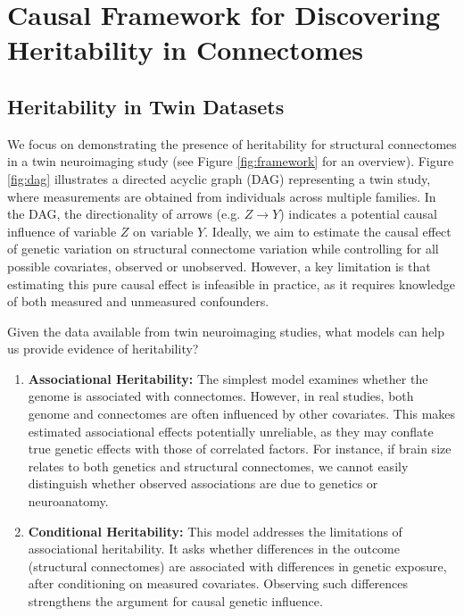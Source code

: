 \section{Causal Framework for Discovering Heritability in Connectomes} 
\subsection{Heritability in Twin Datasets}
We focus on demonstrating the presence of heritability for structural connectomes in a twin neuroimaging study (see Figure \ref{fig:framework} for an overview). Figure \ref{fig:dag} illustrates a directed acyclic graph (DAG) representing a twin study, where measurements are obtained from individuals across multiple families. In the DAG, the directionality of arrows (e.g. $Z\rightarrow Y$)  indicates a potential causal influence of variable $Z$ on variable $Y$. Ideally, we aim to estimate the causal effect of genetic variation on structural connectome variation while controlling for all possible covariates, observed or unobserved. However, a key limitation is that estimating this pure causal effect is infeasible in practice, as it requires knowledge of both measured and unmeasured confounders.

Given the data available from twin neuroimaging studies, what models can help us provide evidence of heritability?
\begin{enumerate}
    \item \textbf{Associational Heritability:} The simplest model examines whether the genome is associated with connectomes. However, in real studies, both genome and connectomes are often influenced by other covariates. This makes estimated associational effects potentially unreliable, as they may conflate true genetic effects with those of correlated factors. For instance, if brain size relates to both genetics and structural connectomes, we cannot easily distinguish whether observed associations are due to genetics or neuroanatomy.
    \item \textbf{Conditional Heritability:} This model addresses the limitations of associational heritability. It asks whether differences in the outcome (structural connectomes) are associated with differences in genetic exposure, after conditioning on measured covariates. Observing such differences strengthens the argument for causal genetic influence.
\end{enumerate}

